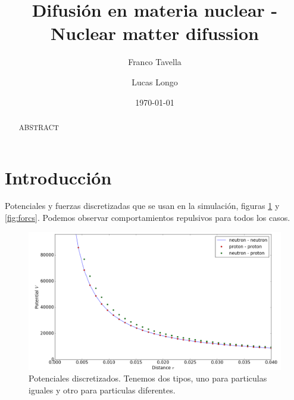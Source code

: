 \documentclass[
 reprint,
 amsmath,amssymb,
 aps,
 a4paper
]{revtex4-1}
\begin{document}
\title{Difusión en materia nuclear - Nuclear matter difussion}

\author{Franco Tavella}%
%

\author{Lucas Longo}%
%

\date{\today}

\begin{abstract}
ABSTRACT

\end{abstract}

\maketitle


\section{\label{seq:intro}Introducción}

Potenciales y fuerzas discretizadas que se usan en la simulación, figuras \ref{fig:pots} y \ref{fig:forcs}. Podemos observar comportamientos repulsivos para todos los casos.
\begin{figure}[H]
\centerline{
  \includegraphics[width=1.0\linewidth]{potentials.png}}
  \caption{\small Potenciales discretizados. Tenemos dos tipos, uno para particulas iguales y otro para particulas diferentes.}
  \label{fig:pots}
\end{figure}
\end{document}
